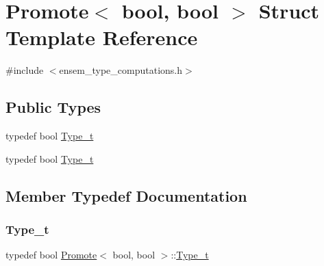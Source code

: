 \hypertarget{structPromote_3_01bool_00_01bool_01_4}{}\section{Promote$<$ bool, bool $>$ Struct Template Reference}
\label{structPromote_3_01bool_00_01bool_01_4}


{\ttfamily \#include $<$ensem\+\_\+type\+\_\+computations.\+h$>$}

\subsection*{Public Types}
\begin{DoxyCompactItemize}
\item 
typedef bool \mbox{\hyperlink{structPromote_3_01bool_00_01bool_01_4_a102643eea236300318f1131229a59556}{Type\+\_\+t}}
\item 
typedef bool \mbox{\hyperlink{structPromote_3_01bool_00_01bool_01_4_a102643eea236300318f1131229a59556}{Type\+\_\+t}}
\end{DoxyCompactItemize}


\subsection{Member Typedef Documentation}
\mbox{\label{structPromote_3_01bool_00_01bool_01_4_a102643eea236300318f1131229a59556}} 
\subsubsection{\texorpdfstring{Type\_t}{Type\_t}\hspace{0.1cm}{\footnotesize\ttfamily [1/2]}}
{\footnotesize\ttfamily typedef bool \mbox{\hyperlink{structPromote}{Promote}}$<$ bool, bool $>$\+::\mbox{\hyperlink{structPromote_3_01bool_00_01bool_01_4_a102643eea236300318f1131229a59556}{Type\+\_\+t}}}

\mbox{\label{structPromote_3_01bool_00_01bool_01_4_a102643eea236300318f1131229a59556}} 
